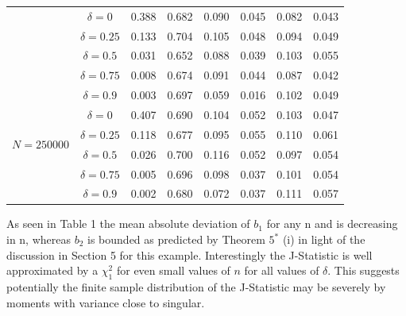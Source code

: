 \documentclass[11pt, fleqn]{article}
\begin{document}
\begin{table}
\begin{tabular}{|cc|cc|cc|cc|}
		
		
		&\hspace{-0.6cm}$\delta=0$      &  0.388 &0.682   &0.090  &0.045 &0.082&0.043       \\  [0.18cm]
		&\hspace{-0.3cm}$\delta=0.25$   &  0.133 &0.704   &0.105  &0.048 &0.094&0.049      \\ [0.18cm]
		&\hspace{-0.35cm}$\delta=0.5$   &  0.031 &0.652   &0.088  &0.039 &0.103&0.055       \\  [0.18cm]
		&\hspace{-0.20cm}$\delta=0.75$  &  0.008 &0.674   &0.091  &0.044 &0.087&0.042        \\ [0.18cm]
		&\hspace{-0.4cm}$\delta=0.9$    &  0.003 &0.697   &0.059  &0.016 &0.102&0.049       \\ [0.18cm]
		
		\hline
		
		\multirow{4}{*}{\begin{sideways}\parbox{2cm}{\centering $N=250000$}\end{sideways}}
		
		
		
		&\hspace{-0.6cm}$\delta=0$        &0.407 &0.690 &0.104  &0.052 &0.103&0.047      \\  [0.18cm]
		&\hspace{-0.3cm}$\delta=0.25$     &0.118 &0.677 &0.095  &0.055 &0.110&0.061      \\ [0.18cm]
		&\hspace{-0.35cm}$\delta=0.5$     &0.026 &0.700 &0.116  &0.052 &0.097&0.054      \\  [0.18cm]
		&\hspace{-0.20cm}$\delta=0.75$    &0.005 &0.696 &0.098  &0.037 &0.101&0.054       \\ [0.18cm]
		&\hspace{-0.4cm}$\delta=0.9$      &0.002 &0.680 & 0.072 &0.037 &0.111&0.057       \\ [0.18cm]
		
		\hline
		
	\end{tabular}
	\label{turns}
\end{table}

As seen in Table 1 the mean absolute deviation of $b_1$  for any n and is decreasing in n, whereas $b_2$ is bounded as predicted by Theorem $5^*$ (i) in light of the discussion in Section 5 for this example.
 Interestingly the J-Statistic is well approximated by a $\chi^2_1$ for even small values of $n$ for all values of $\delta$.  This suggests potentially the finite sample distribution of the J-Statistic may be severely by moments with variance close to singular.
\end{document}
